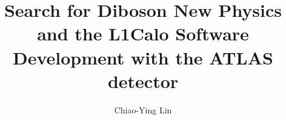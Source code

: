 \documentclass[hyperpdf,bindnopdf]{hepthesis}
\title{Search for Diboson New Physics and the L1Calo Software Development with the ATLAS detector}
\author{Chiao-Ying Lin}
\begin{document}
\begin{frontmatter}
    
\end{frontmatter}
	
\begin{mainmatter}
	\begin{spacing}{1.4}
    
    \let\cleardoublepage\clearpage
    
	\let\cleardoublepage\clearpage
 	
 	\let\cleardoublepage\clearpage
 	
 	\let\cleardoublepage\clearpage
 	
 	\let\cleardoublepage\clearpage
 	
    \let\cleardoublepage\clearpage
 	
 	\let\cleardoublepage\clearpage
 	\end{spacing}
\end{mainmatter}
	
	\begin{appendices}
		
		
	\end{appendices}
	
	\begin{backmatter}
		
	\end{backmatter}
	
\end{document}
